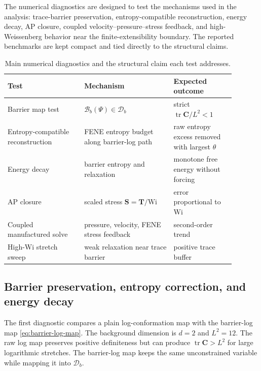 ﻿\documentclass[11pt]{amsart}
\newcommand{\CC}{\bm C}
\newcommand{\SSS}{\bm S}
\newcommand{\TT}{\bm T}
\newcommand{\Wi}{\mathrm{Wi}}
\newcommand{\calD}{\mathcal D}
\newcommand{\tr}{\operatorname{tr}}
\begin{document}
The numerical diagnostics are designed to test the mechanisms used in the analysis: trace-barrier preservation, entropy-compatible reconstruction, energy decay, AP closure, coupled velocity--pressure--stress feedback, and high-Weissenberg behavior near the finite-extensibility boundary.  The reported benchmarks are kept compact and tied directly to the structural claims.

\begin{table}[htbp]
\centering
\caption{Main numerical diagnostics and the structural claim each test addresses.}
\label{tab:diagnostic-map}
\small
\begin{tabular}{p{0.30\linewidth}p{0.35\linewidth}p{0.24\linewidth}}
\toprule
Test & Mechanism & Expected outcome \\
\midrule
Barrier map test & $\mathcal B_b(\Psi)\in\calD_b$ & strict $\tr\CC/L^2<1$ \\
Entropy-compatible reconstruction & FENE entropy budget along barrier-log path & raw entropy excess removed with largest $\theta$ \\
Energy decay & barrier entropy and relaxation & monotone free energy without forcing \\
AP closure & scaled stress $\SSS=\TT/\Wi$ & error proportional to $\Wi$ \\
Coupled manufactured solve & pressure, velocity, FENE stress feedback & second-order trend \\
High-$\Wi$ stretch sweep & weak relaxation near trace barrier & positive trace buffer \\
\bottomrule
\end{tabular}
\end{table}

\subsection{Barrier preservation, entropy correction, and energy decay}

The first diagnostic compares a plain log-conformation map with the barrier-log map \eqref{eq:barrier-log-map}.  The background dimension is $d=2$ and $L^2=12$.  The raw log map preserves positive definiteness but can produce $\tr\CC>L^2$ for large logarithmic stretches.  The barrier-log map keeps the same unconstrained variable while mapping it into $\calD_b$.
\end{document}
